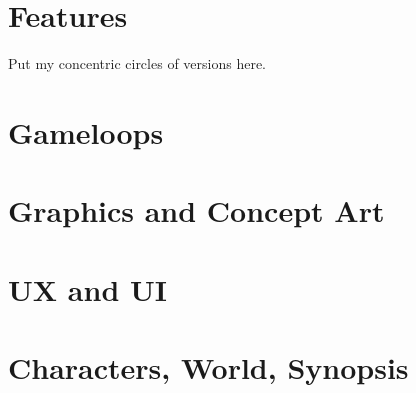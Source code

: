 \documentclass{scrartcl}
\begin{document}
	\section{Features}
		Put my concentric circles of versions here.
	\section{Gameloops}
	\section{Graphics and Concept Art}
	\section{UX and UI}
	\section{Characters, World, Synopsis}
	
	
\end{document}
